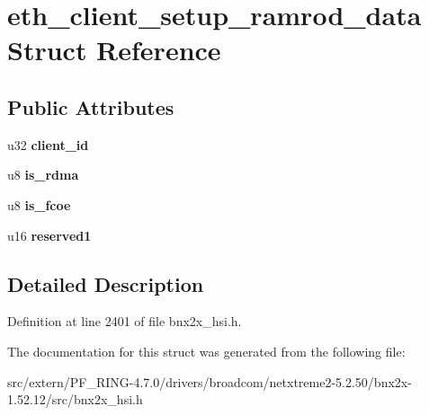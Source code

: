 \hypertarget{structeth__client__setup__ramrod__data}{
\section{eth\_\-client\_\-setup\_\-ramrod\_\-data Struct Reference}
\label{structeth__client__setup__ramrod__data}
}
\subsection*{Public Attributes}
\begin{DoxyCompactItemize}
\item 
\hypertarget{structeth__client__setup__ramrod__data_a3415d4a1460636bc4a260f5546d0f421}{
u32 {\bfseries client\_\-id}}
\label{structeth__client__setup__ramrod__data_a3415d4a1460636bc4a260f5546d0f421}

\item 
\hypertarget{structeth__client__setup__ramrod__data_aa5c62dfe8c973edc9495ce8112378cd9}{
u8 {\bfseries is\_\-rdma}}
\label{structeth__client__setup__ramrod__data_aa5c62dfe8c973edc9495ce8112378cd9}

\item 
\hypertarget{structeth__client__setup__ramrod__data_a0cebc8a95cbbc4a2929ce16647d0de9b}{
u8 {\bfseries is\_\-fcoe}}
\label{structeth__client__setup__ramrod__data_a0cebc8a95cbbc4a2929ce16647d0de9b}

\item 
\hypertarget{structeth__client__setup__ramrod__data_a4082ced272fb9cc4808cd2bcc8ccbd67}{
u16 {\bfseries reserved1}}
\label{structeth__client__setup__ramrod__data_a4082ced272fb9cc4808cd2bcc8ccbd67}

\end{DoxyCompactItemize}


\subsection{Detailed Description}


Definition at line 2401 of file bnx2x\_\-hsi.h.



The documentation for this struct was generated from the following file:\begin{DoxyCompactItemize}
\item 
src/extern/PF\_\-RING-\/4.7.0/drivers/broadcom/netxtreme2-\/5.2.50/bnx2x-\/1.52.12/src/bnx2x\_\-hsi.h\end{DoxyCompactItemize}
